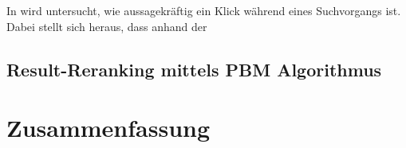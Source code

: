 In \cite{Joachims} wird untersucht, wie aussagekräftig ein Klick während eines Suchvorgangs ist. Dabei stellt sich heraus, dass anhand der

\subsection{Result-Reranking mittels PBM Algorithmus}
\label{sec:Grundlagen:Result-RerankingPBM}


\section{Zusammenfassung}
\label{sec:Grundlagen:Zusammenfassung}